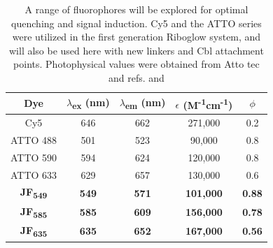 \begin{table}
\caption{A range of fluorophores will be explored for optimal quenching and signal induction. Cy5 and the ATTO series were utilized in the first generation Riboglow system, and will also be used here with new linkers and Cbl attachment points. Photophysical values were obtained from Atto tec and refs. \cite{BraselmannDevelopmentriboswitchbasedplatform2017} and \cite{Grimmgeneralmethodfinetune2017}}\label{fluorophores}
\begin{tabular}{c|cccc}
  \toprule
 Dye &  $\lambda$\textsubscript{ex} (nm) &  $\lambda$\textsubscript{em} (nm) &  $\epsilon$ (M\textsuperscript{-1}cm\textsuperscript{-1}) &  $\phi$ \\\toprule
Cy5 & 646 & 662 & 271,000 & 0.2\\
ATTO 488 & 501 & 523 & 90,000 & 0.8\\
ATTO 590 & 594 & 624 & 120,000 & 0.8\\
ATTO 633 & 629 & 657 & 130,000 & 0.6\\  \hline
\textbf{JF\textsubscript{549}} & \textbf{549} & \textbf{571} & \textbf{101,000} & \textbf{0.88}\\ %
\textbf{JF\textsubscript{585}} & \textbf{585} & \textbf{609} & \textbf{156,000} & \textbf{0.78}\\
\textbf{JF\textsubscript{635}} & \textbf{635} & \textbf{652} & \textbf{167,000} & \textbf{0.56}\\
\bottomrule
\end{tabular}
\end{table}

